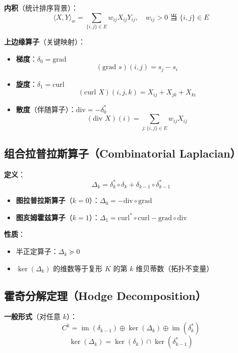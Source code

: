 \documentclass[a4paper]{article}
\begin{document}
    \indent\textbf{内积}（统计排序背景）：
    \[
    \langle X, Y \rangle_w = \sum_{\{i,j\} \in E} w_{ij} X_{ij} Y_{ij}, \quad w_{ij} > 0 \text{ 当 } \{i,j\} \in E
    \]
    
    \indent \textbf{上边缘算子}（关键映射）：
    \begin{itemize}
        \item \textbf{梯度}：\(\delta_0 = \text{grad}\)  
        \[
        (\text{grad } s)(i,j) = s_j - s_i
        \]
        \item \textbf{旋度}：\(\delta_1 = \text{curl}\)  
        \[
        (\text{curl } X)(i,j,k) = X_{ij} + X_{jk} + X_{ki}
        \]
        \item \textbf{散度}（伴随算子）：\(\text{div} = -\delta_0^*\)  
        \[
        (\text{div } X)(i) = \sum_{j: \{i,j\} \in E} w_{ij} X_{ij}
        \]
    \end{itemize}

\subsection{组合拉普拉斯算子（Combinatorial Laplacian）}
\indent \textbf{定义}：
    \[
    \Delta_k = \delta_k^* \circ \delta_k + \delta_{k-1} \circ \delta_{k-1}^*
    \]
    \begin{itemize}
        \item \textbf{图拉普拉斯算子}（\(k=0\)）：\(\Delta_0 = -\text{div} \circ \text{grad}\)
        \item \textbf{图亥姆霍兹算子}（\(k=1\)）：\(\Delta_1 = \text{curl}^* \circ \text{curl} - \text{grad} \circ \text{div}\)
    \end{itemize}
    
    \indent \textbf{性质}：
    \begin{itemize}
        \item 半正定算子：\(\Delta_k \succeq 0\)
        \item \(\ker(\Delta_k)\) 的维数等于复形 \(K\) 的第 \(k\) 维贝蒂数（拓扑不变量）
    \end{itemize}

\subsection{霍奇分解定理（Hodge Decomposition）}
\indent \textbf{一般形式}（对任意 \(k\)）：
    \[
    C^k = \operatorname{im}(\delta_{k-1}) \oplus \ker(\Delta_k) \oplus \operatorname{im}(\delta_k^*)
    \]
    \[
    \ker(\Delta_k) = \ker(\delta_k) \cap \ker(\delta_{k-1}^*)
    \]
    
\end{document}
